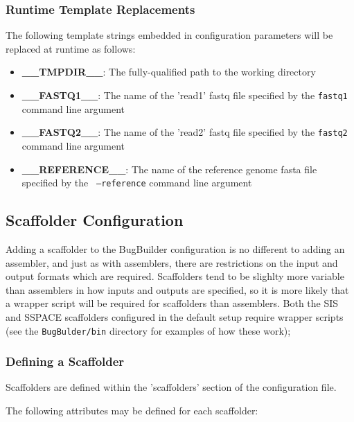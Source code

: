 \documentclass[a4paper,twoside,10pt]{article}
\begin{document}
\subsubsection{Runtime Template Replacements}

The following template strings embedded in configuration parameters will be replaced at runtime as
follows:

\begin{itemize}
\item {\bf \_\_TMPDIR\_\_}: The fully-qualified path to the working directory
\item {\bf \_\_FASTQ1\_\_}: The name of the 'read1' fastq file specified by the {\tt fastq1}
command line argument
\item {\bf \_\_FASTQ2\_\_}: The name of the 'read2' fastq file specified by the {\tt fastq2}
command line argument
\item {\bf \_\_REFERENCE\_\_}: The name of the reference genome fasta file specified by the {\tt
--reference} command line argument
\end{itemize}

\subsection{Scaffolder Configuration}

Adding a scaffolder to the BugBuilder configuration is no different to adding an assembler, and
just as with assemblers, there are restrictions on the input and output formats which are required.
Scaffolders tend to be slighlty more variable than assemblers in how inputs and outputs are
specified, so it is more likely that a wrapper script will be required for scaffolders than
assemblers. Both the SIS and SSPACE scaffolders configured in the default setup require wrapper
scripts (see the {\tt BugBulder/bin} directory for examples of how these work);

\subsubsection{Defining a Scaffolder}

Scaffolders are defined within the 'scaffolders' section of the configuration file. 

The following attributes may be defined for each scaffolder:
\end{document}
